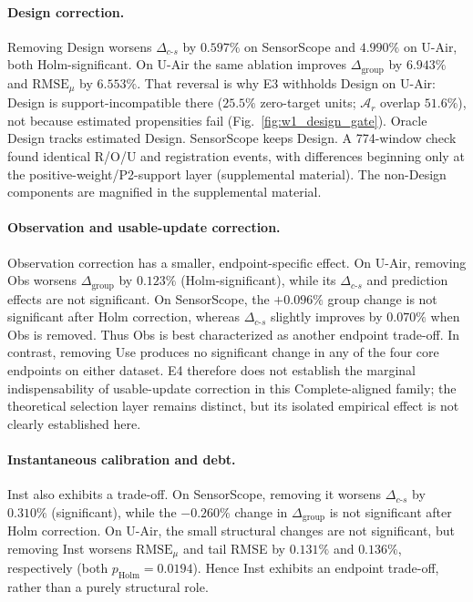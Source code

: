 \documentclass[letterpaper,journal]{IEEEtran}
\begin{document}
\paragraph{Design correction.}
Removing Design worsens $\Delta_{c\text{-}s}$ by $0.597\%$ on SensorScope and
$4.990\%$ on U-Air, both Holm-significant.  On U-Air the same ablation
improves $\Delta_{\mathrm{group}}$ by $6.943\%$ and
$\mathrm{RMSE}_{\mu}$ by $6.553\%$.  That reversal is why E3 withholds
Design on U-Air: Design is support-incompatible there
($25.5\%$ zero-target units; $\mathcal{A}_r$ overlap $51.6\%$), not
because estimated propensities fail
(Fig.~\ref{fig:w1_design_gate}).  Oracle Design tracks estimated
Design.  SensorScope keeps Design.  A 774-window check found identical
R/O/U and registration events, with differences beginning only at the
positive-weight/P2-support layer
(supplemental material).
The non-Design components are magnified in the supplemental material.

\paragraph{Observation and usable-update correction.}
Observation correction has a smaller, endpoint-specific effect.  On U-Air,
removing Obs worsens $\Delta_{\mathrm{group}}$ by $0.123\%$
(Holm-significant), while its $\Delta_{c\text{-}s}$ and prediction effects are
not significant.  On SensorScope, the $+0.096\%$ group change is not
significant after Holm correction, whereas
$\Delta_{c\text{-}s}$ slightly improves by $0.070\%$ when Obs is removed.
Thus Obs is best characterized as another endpoint trade-off.  In contrast,
removing Use produces no significant change in any of the four core endpoints
on either dataset.  E4 therefore does not establish the marginal
indispensability of usable-update correction in this Complete-aligned family;
the theoretical selection layer remains distinct, but its isolated empirical
effect is not clearly established here.

\paragraph{Instantaneous calibration and debt.}
Inst also exhibits a trade-off.  On SensorScope, removing it worsens
$\Delta_{c\text{-}s}$ by $0.310\%$ (significant), while the
$-0.260\%$ change in $\Delta_{\mathrm{group}}$ is not significant after Holm
correction.  On U-Air, the small structural
changes are not significant, but removing Inst worsens
$\mathrm{RMSE}_{\mu}$ and tail RMSE by $0.131\%$ and $0.136\%$,
respectively (both $p_{\mathrm{Holm}}=0.0194$).  Hence Inst exhibits an
endpoint trade-off, rather than a purely structural role.
\end{document}

